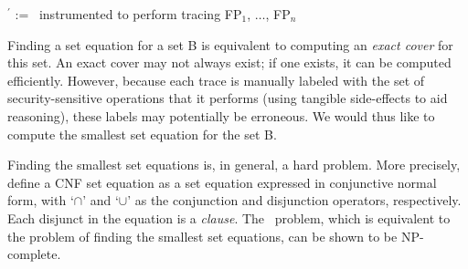 \linesnumbered
\begin{algorithm}[ht!]
%
\SetVline
{}
%
%
%
\server$^\prime$ := \server\ instrumented to perform tracing\;
%
%
%
\Return FP$_1$, $\ldots$, FP$_n$
\end{algorithm}

Finding a set equation for a set B is equivalent to computing an \textit{exact
cover} for this set. An exact cover may not always exist; if one exists, it can
be computed efficiently. However, because each trace is manually labeled with
the set of security-sensitive operations that it performs (using tangible
side-effects to aid reasoning), these labels may potentially be erroneous.  We
would thus like to compute the smallest set equation for the set B.

Finding the smallest set equations is, in general, a hard problem. More
precisely, define a CNF set equation as a set equation expressed in conjunctive
normal form, with `$\cap$' and `$\cup$' as the conjunction and disjunction
operators, respectively. Each disjunct in the equation is a \textit{clause}.
The \kcnfse\ problem, which is equivalent to the problem of finding the smallest 
set equations, can be shown to be \textsf{NP}-complete.

